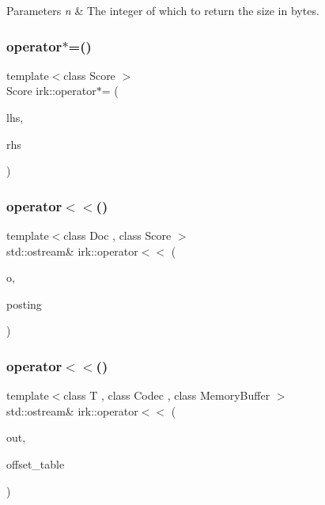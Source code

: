 \begin{DoxyParams}{Parameters}
{\em n} & The integer of which to return the size in bytes. \\
\hline
\end{DoxyParams}
\mbox{\label{namespaceirk_ab8e6b6b40ddf91037ece69b4c14d091f}} 
\subsubsection{\texorpdfstring{operator$\ast$=()}{operator*=()}}
{\footnotesize\ttfamily template$<$class Score $>$ \\
Score irk\+::operator$\ast$= (\begin{DoxyParamCaption}\item[{Score \&}]{lhs,  }\item[{const \mbox{\hyperlink{structirk_1_1no__weight}{no\+\_\+weight}} \&}]{rhs }\end{DoxyParamCaption})}

\mbox{\label{namespaceirk_a94643c4295628e30b30002810c4a2327}} 
\subsubsection{\texorpdfstring{operator$<$$<$()}{operator<<()}\hspace{0.1cm}{\footnotesize\ttfamily [1/3]}}
{\footnotesize\ttfamily template$<$class Doc , class Score $>$ \\
std\+::ostream\& irk\+::operator$<$$<$ (\begin{DoxyParamCaption}\item[{std\+::ostream \&}]{o,  }\item[{\mbox{\hyperlink{structirk_1_1__posting}{\+\_\+posting}}$<$ Doc, Score $>$}]{posting }\end{DoxyParamCaption})}

\mbox{\label{namespaceirk_a2bc6394c2673a19ce5bf0ca74641c41d}} 
\subsubsection{\texorpdfstring{operator$<$$<$()}{operator<<()}\hspace{0.1cm}{\footnotesize\ttfamily [2/3]}}
{\footnotesize\ttfamily template$<$class T , class Codec , class Memory\+Buffer $>$ \\
std\+::ostream\& irk\+::operator$<$$<$ (\begin{DoxyParamCaption}\item[{std\+::ostream \&}]{out,  }\item[{const \mbox{\hyperlink{classirk_1_1compact__table}{compact\+\_\+table}}$<$ T, Codec, Memory\+Buffer $>$ \&}]{offset\+\_\+table }\end{DoxyParamCaption})}

